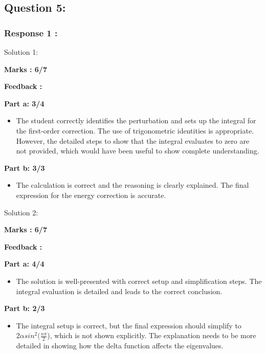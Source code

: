 \documentclass[a4paper,11pt]{article}
\begin{document}
\subsection*{Question 5:}

\subsubsection*{Response 1 :}

Solution 1:


\textbf{ Marks : 6/7}

\textbf{Feedback :}

\textbf{Part a: 3/4}

\begin{itemize}
    \item The student correctly identifies the perturbation and sets up the integral for the first-order correction. The use of trigonometric identities is appropriate. However, the detailed steps to show that the integral evaluates to zero are not provided, which would have been useful to show complete understanding.
\end{itemize}

\textbf{Part b: 3/3}
\begin{itemize}
    \item The calculation is correct and the reasoning is clearly explained. The final expression for the energy correction is accurate.
\end{itemize}



Solution 2:


\textbf{ Marks : 6/7}

\textbf{Feedback :}

\textbf{Part a: 4/4}

\begin{itemize}
    \item The solution is well-presented with correct setup and simplification steps. The integral evaluation is detailed and leads to the correct conclusion.
\end{itemize}

\textbf{Part b: 2/3}
\begin{itemize}
    \item The integral setup is correct, but the final expression should simplify to $2\alpha sin^2(\frac{n\pi}{2}$), which is not shown explicitly. The explanation needs to be more detailed in showing how the delta function affects the eigenvalues.
\end{itemize}
\end{document}

